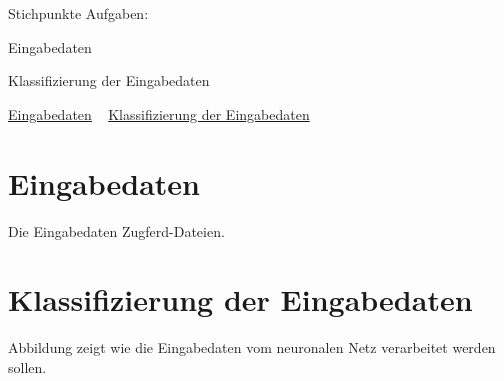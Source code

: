 Stichpunkte Aufgaben\+:
\begin{DoxyEnumerate}
\item Eingabedaten
\item Klassifizierung der Eingabedaten
\end{DoxyEnumerate}

\hyperlink{Eingabedaten}{Eingabedaten} ~\newline
\hyperlink{Klassifizierung}{Klassifizierung der Eingabedaten} ~\newline
\hypertarget{Eingabedaten}{}\section{Eingabedaten}\label{Eingabedaten}
Die Eingabedaten Zugferd-\/\+Dateien. \hypertarget{Klassifizierung}{}\section{Klassifizierung der Eingabedaten}\label{Klassifizierung}
Abbildung zeigt wie die Eingabedaten vom neuronalen Netz verarbeitet werden sollen. 